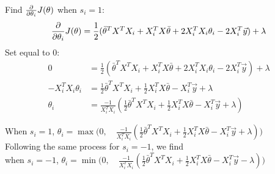 \documentclass[11pt]{article}
\begin{document}
Find $\frac{\partial}{\partial\theta_i} J(\theta)$ when $s_i = 1$:
\begin{align*}
\frac{\partial}{\partial\theta_i} J(\theta) = \frac{1}{2} ( \bar{\theta}^T X^T X_i + X_i^T X \bar{\theta} + 2 X_i^T X_i \theta_i - 2 X_i^T \vec{y}) + \lambda \\
\end{align*}
Set equal to 0:
\begin{align*}
                       0 &= \frac{1}{2} ( \bar{\theta}^T X^T X_i + X_i^T X \bar{\theta} + 2 X_i^T X_i \theta_i - 2 X_i^T \vec{y}) + \lambda \\
    - X_i^T X_i \theta_i &= \frac{1}{2} \bar{\theta}^T X^T X_i + \frac{1}{2} X_i^T X \bar{\theta} - X_i^T \vec{y} + \lambda \\
                \theta_i &= \frac{-1}{X_i^T X_i} (\frac{1}{2} \bar{\theta}^T X^T X_i + \frac{1}{2} X_i^T X \bar{\theta} - X_i^T \vec{y} + \lambda)
\end{align*}

When $s_i = 1$, $\theta_i = \max\bigg(0,\quad \frac{-1}{X_i^T X_i} (\frac{1}{2} \bar{\theta}^T X^T X_i + \frac{1}{2} X_i^T X \bar{\theta} - X_i^T \vec{y} + \lambda)\bigg)$ \\

Following the same process for $s_i = -1$, we find \\

when $s_i = -1$, $\theta_i = \min\bigg(0, \quad \frac{-1}{X_i^T X_i} (\frac{1}{2} \bar{\theta}^T X^T X_i + \frac{1}{2} X_i^T X \bar{\theta} - X_i^T \vec{y} - \lambda) \bigg)$ \\
\end{document}
